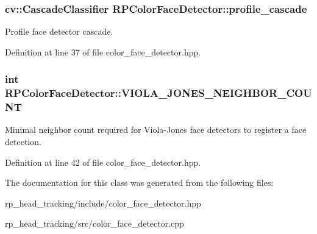\hypertarget{class_r_p_color_face_detector_a27f973deeb52ebaa3c9a49a8eace16a5}{
\subsubsection[{profile\-\_\-cascade}]{\setlength{\rightskip}{0pt plus 5cm}cv\-::\-Cascade\-Classifier {\bf \-R\-P\-Color\-Face\-Detector\-::profile\-\_\-cascade}}}\label{class_r_p_color_face_detector_a27f973deeb52ebaa3c9a49a8eace16a5}
\-Profile face detector cascade. 

\-Definition at line 37 of file color\-\_\-face\-\_\-detector.\-hpp.

\hypertarget{class_r_p_color_face_detector_ae86967285f09aa17afa81dce94642aff}{
\subsubsection[{\-V\-I\-O\-L\-A\-\_\-\-J\-O\-N\-E\-S\-\_\-\-N\-E\-I\-G\-H\-B\-O\-R\-\_\-\-C\-O\-U\-N\-T}]{\setlength{\rightskip}{0pt plus 5cm}int {\bf \-R\-P\-Color\-Face\-Detector\-::\-V\-I\-O\-L\-A\-\_\-\-J\-O\-N\-E\-S\-\_\-\-N\-E\-I\-G\-H\-B\-O\-R\-\_\-\-C\-O\-U\-N\-T}}}\label{class_r_p_color_face_detector_ae86967285f09aa17afa81dce94642aff}
\-Minimal neighbor count required for \-Viola-\/\-Jones face detectors to register a face detection. 

\-Definition at line 42 of file color\-\_\-face\-\_\-detector.\-hpp.



\-The documentation for this class was generated from the following files\-:\begin{DoxyCompactItemize}
\item 
rp\-\_\-head\-\_\-tracking/include/color\-\_\-face\-\_\-detector.\-hpp\item 
rp\-\_\-head\-\_\-tracking/src/color\-\_\-face\-\_\-detector.\-cpp\end{DoxyCompactItemize}
